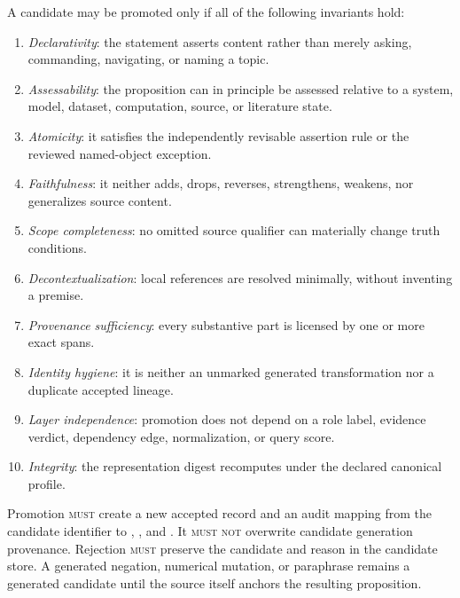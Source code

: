 A candidate may be promoted only if all of the following invariants hold:
\begin{enumerate}[label=\textup{A\arabic*.}]
  \item \emph{Declarativity}: the statement asserts content rather than merely asking, commanding, navigating, or naming a topic.
  \item \emph{Assessability}: the proposition can in principle be assessed relative to a system, model, dataset, computation, source, or literature state.
  \item \emph{Atomicity}: it satisfies the independently revisable assertion rule or the reviewed named-object exception.
  \item \emph{Faithfulness}: it neither adds, drops, reverses, strengthens, weakens, nor generalizes source content.
  \item \emph{Scope completeness}: no omitted source qualifier can materially change truth conditions.
  \item \emph{Decontextualization}: local references are resolved minimally, without inventing a premise.
  \item \emph{Provenance sufficiency}: every substantive part is licensed by one or more exact spans.
  \item \emph{Identity hygiene}: it is neither an unmarked generated transformation nor a duplicate accepted lineage.
  \item \emph{Layer independence}: promotion does not depend on a role label, evidence verdict, dependency edge, normalization, or query score.
  \item \emph{Integrity}: the representation digest recomputes under the declared canonical profile.
\end{enumerate}

Promotion \textsc{must} create a new accepted record and an audit mapping from the candidate identifier to , , and . It \textsc{must not} overwrite candidate generation provenance. Rejection \textsc{must} preserve the candidate and reason in the candidate store. A generated negation, numerical mutation, or paraphrase remains a generated candidate until the source itself anchors the resulting proposition.

